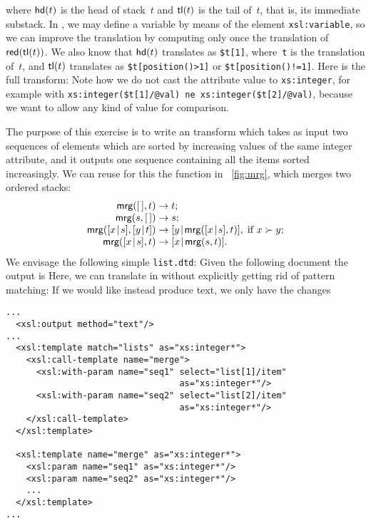 where \(\textsf{hd}(t)\)  is the head of
stack~\(t\) and \(\textsf{tl}(t)\)  is the tail
of~\(t\), that is, its immediate substack. In \XSLT, we may define a
variable by means of the element \texttt{xsl:variable}, so we can
improve the translation by computing only once the translation of
\(\textsf{red}(\textsf{tl}(t))\). We also know that \(\textsf{hd}(t)\)
translates as \texttt{\$t[1]}, where~\texttt{t} is the translation
of~\(t\), and \(\textsf{tl}(t)\) translates as \texttt{\$t[position()>1]}
or \texttt{\$t[position()!=1]}. Here is the full transform:
\noindent Note how we do not cast the attribute value to
\texttt{xs:integer}, for example with
\texttt{xs:integer(\$t[1]/@val) ne xs:integer(\$t[2]/@val)}, because
we want to allow any kind of value for comparison.

\label{par:merging}

The purpose of this exercise is to write an \XSLT transform which
takes as input two sequences of elements which are sorted by
increasing values of the same integer attribute, and it outputs one
sequence containing all the items sorted increasingly. We can reuse
for this the function  in \fig~\vref{fig:mrg}, which merges
two ordered stacks:
\begin{equation*}
\begin{array}{r@{\;}l@{\;}l}
\fun{mrg}(\el,t)         & \rightarrow & t;\\
\fun{mrg}(s,\el)         & \rightarrow & s;\\
\fun{mrg}(\cons{x}{s},\cons{y}{t}) & \rightarrow
& \cons{y}{\fun{mrg}(\cons{x}{s},t)},\;\text{if \(x \succ y\)};\\
\fun{mrg}(\cons{x}{s},t) & \rightarrow & \cons{x}{\fun{mrg}(s,t)}.
\end{array}
\end{equation*}
We envisage the following simple \DTD \texttt{list.dtd}:
\noindent Given the following \XML document
\noindent the output is
Here, we can translate  in \XSLT without explicitly getting
rid of pattern matching:
\noindent If we would like instead produce text, we only have the
changes
\begin{verbatim}
...
  <xsl:output method="text"/>
...
  <xsl:template match="lists" as="xs:integer*">
    <xsl:call-template name="merge">
      <xsl:with-param name="seq1" select="list[1]/item"
                                  as="xs:integer*"/>
      <xsl:with-param name="seq2" select="list[2]/item"
                                  as="xs:integer*"/>
    </xsl:call-template>
  </xsl:template>

  <xsl:template name="merge" as="xs:integer*">
    <xsl:param name="seq1" as="xs:integer*"/>
    <xsl:param name="seq2" as="xs:integer*"/>
    ...
  </xsl:template>
...
\end{verbatim}


